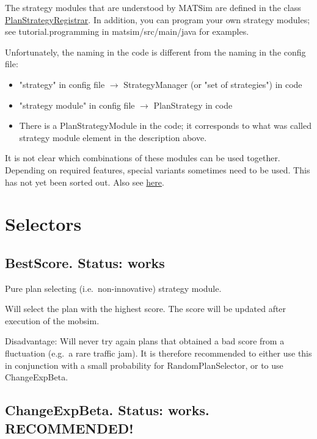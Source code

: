 The strategy modules that are understood by MATSim are defined in the class \href{http://www.matsim.org/xref/org/matsim/core/controler/PlanStrategyRegistrar.html}{PlanStrategyRegistrar}. In addition, you can program your own strategy modules; see tutorial.programming in matsim/src/main/java for examples.

Unfortunately, the naming in the code is different from the naming in the config file:
\begin{itemize}
	\item "strategy" in config file $\rightarrow$ StrategyManager (or "set of strategies") in code
	\item "strategy module" in config file $\rightarrow$ PlanStrategy in code
	\item There is a PlanStrategyModule in the code; it corresponds to what was called strategy module element in the description above.
\end{itemize}

It is not clear which combinations of these modules can be used  together. Depending on required features, special variants sometimes  need to be used. This has not yet been sorted out. Also see \href{http://matsim.org/node/690}{here}.


\umbruch

\section{Selectors}
\label{sec:selectors}

\subsection{BestScore.  Status: works}

Pure plan selecting (i.e.\ non-innovative) strategy module.

Will select the plan with the highest score. The score will be updated after execution of the mobsim.

Disadvantage: Will never try again plans that obtained a bad score  from a fluctuation (e.g.\ a rare traffic jam). It is therefore  recommended to either use this in conjunction with a small probability  for RandomPlanSelector, or to use ChangeExpBeta.

\subsection{ChangeExpBeta. Status: works. RECOMMENDED!}


